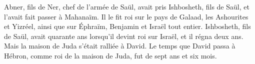 Abner, fils de Ner, chef de l’armée de Saül,
	avait pris Ishbosheth, fils de Saül, et l’avait fait passer à Mahanaïm.
Il le fit roi sur le pays de Galaad, les Ashourites et Yizréel,
	ainsi que sur Éphraïm, Benjamin et Israël tout entier.
Ishbosheth, fils de Saül, avait quarante ans lorsqu’il devint roi sur Israël,
	et il régna deux ans.
Mais la maison de Juda s’était ralliée à David.
Le temps que David passa à Hébron, comme roi de la maison de Juda,
	fut de sept ans et six mois.
